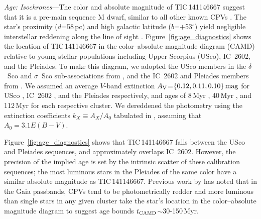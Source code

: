 \documentclass[11pt,twocolumn,tighten,linenumbers]{aastex7}
\begin{document}
{\it Age: Isochrones}---The color and absolute magnitude of
TIC\,141146667 suggest that it is a pre-main sequence M dwarf, similar
to all other known CPVs \citep{Stauffer2017,Stauffer2021,Bouma2024}.
The star's proximity ($d$=58\,pc) and high galactic latitude
($b$=$+$53$^\circ$) yield negligible interstellar reddening along the
line of sight \citep{Green2019}.  Figure~\ref{fig:age_diagnostics}
shows the location of TIC\,141146667 in the color--absolute magnitude
diagram (CAMD) relative to young stellar populations including Upper
Scorpius (USco), IC~2602, and the Pleiades.  To make this diagram, we
adopted the USco members in the $\delta$~Sco and $\sigma$~Sco
sub-associations from \citet{Ratzenbock2023}, and the IC~2602 and
Pleiades members from \citet{Hunt2024}.  We assumed an average $V$-band
extinction $A_{\rm V}$=$\{0.12, 0.11, 0.10\}\,{\rm mag}$ for USco
\citep{Pecaut2016}, IC~2602 \citep{Hunt2024}, and the Pleiades
\citep{Hunt2024} respectively, and ages of 8\,Myr
\citep{Ratzenbock2023}, 40\,Myr \citep{Randich2018}, and 112\,Myr
\citep{Dahm2015} for each respective cluster.  We dereddened the
photometry using the extinction coefficients $k_X\equiv A_X/A_0$
tabulated in \citep{GaiaCollaboration2018}, assuming that $A_0 = 3.1
E(B-V)$.

Figure~\ref{fig:age_diagnostics} shows that TIC\,141146667 falls
between the USco and Pleiades sequences, and approximately overlaps
IC~2602.  However, the precision of the implied age is set by the
intrinsic scatter of these calibration sequences; the most luminous
stars in the Pleiades of the same color have a similar absolute
magnitude as TIC\,141146667.  Previous work by \citet{Stauffer2021} has
noted that in the Gaia passbands, CPVs tend to be photometrically
redder and more luminous than single stars in any given
cluster
take the star's location in the color--absolute magnitude diagram
to suggest age bounds $t_{\rm CAMD}$$\sim$30-150\,Myr.
\end{document}
